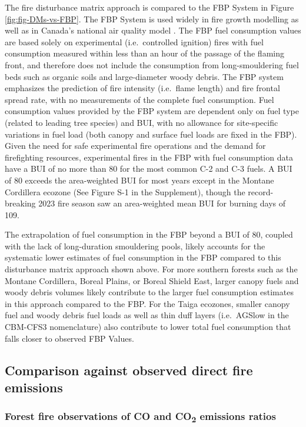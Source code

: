 \documentclass[, manuscript]{copernicus}
\begin{document}
The fire disturbance matrix approach is compared to the FBP System in
Figure \ref{fig:fig-DMs-vs-FBP}. The FBP System is used widely in fire
growth modelling as well as in Canada's national air quality model
\citep{chen2019}. The FBP fuel consumption values are based solely on
experimental (i.e.~controlled ignition) fires with fuel consumption
measured within less than an hour of the passage of the flaming front,
and therefore does not include the consumption from long-smouldering
fuel beds such as organic soils and large-diameter woody debris. The FBP
system emphasizes the prediction of fire intensity (i.e.~flame length)
and fire frontal spread rate, with no measurements of the complete fuel
consumption. Fuel consumption values provided by the FBP system are
dependent only on fuel type (related to leading tree species) and BUI,
with no allowance for site-specific variations in fuel load (both canopy
and surface fuel loads are fixed in the FBP). Given the need for safe
experimental fire operations and the demand for firefighting resources,
experimental fires in the FBP with fuel consumption data have a BUI of
no more than 80 for the most common C-2 and C-3 fuels. A BUI of 80
exceeds the area-weighted BUI for most years except in the Montane
Cordillera ecozone (See Figure S-1 in the Supplement), though the
record-breaking 2023 fire season saw an area-weighted mean BUI for
burning days of 109.

The extrapolation of fuel consumption in the FBP beyond a BUI of 80,
coupled with the lack of long-duration smouldering pools, likely
accounts for the systematic lower estimates of fuel consumption in the
FBP compared to this disturbance matrix approach shown above. For more
southern forests such as the Montane Cordillera, Boreal Plains, or
Boreal Shield East, larger canopy fuels and woody debris volumes likely
contribute to the larger fuel consumption estimates in this approach
compared to the FBP. For the Taiga ecozones, smaller canopy fuel and
woody debris fuel loads as well as thin duff layers (i.e.~AGSlow in the
CBM-CFS3 nomenclature) also contribute to lower total fuel consumption
that falls closer to observed FBP Values.

\subsection{Comparison against observed direct fire emissions}

\subsubsection{\texorpdfstring{Forest fire observations of CO and
CO\textsubscript{2} emissions
ratios}{Forest fire observations of CO and CO2 emissions ratios}}
\end{document}
